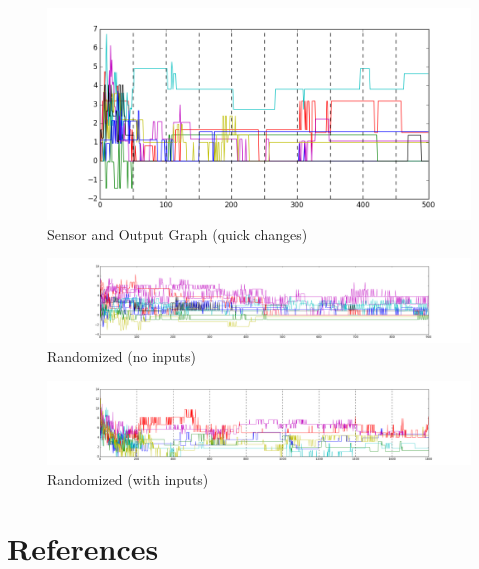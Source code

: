 \documentclass[12pt]{article}
\begin{document}
\begin{figure}[H]
    \centering
    \includegraphics[width=\textheight,angle=270,keepaspectratio]{../visualizations/8knodes_quick_changes.png}
    \caption{Sensor and Output Graph (quick changes)}
\end{figure}

\begin{figure}[H]
    \centering
    \includegraphics[width=\textheight,angle=270,keepaspectratio]{../visualizations/8knodes_stable_line.png}
    \caption{Randomized (no inputs)}
\end{figure}

\begin{figure}[H]
    \centering
    \includegraphics[width=\textheight,angle=270,keepaspectratio]{../visualizations/8knodes_sensors_lineannotated.png}
    \caption{Randomized (with inputs)}
\end{figure}


\newpage

\section{References}

\printbibliography[heading=none]
\end{document}
